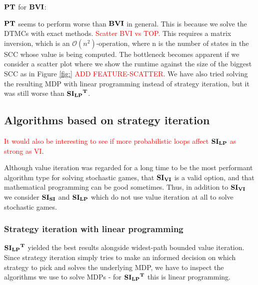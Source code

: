 $\mathbf{PT}$ for $\mathbf{BVI}$:

$\mathbf{PT}$ seems to perform worse than $\mathbf{BVI}$ in general. This is because we solve the DTMCs with exact methods. 
\textcolor{red}{Scatter BVI vs TOP.}
This requires a matrix inversion, which is an $\mathcal{O}(n^{2})$-operation, where n is the number of states in the SCC whose value is being computed.
The bottleneck becomes apparent if we consider a scatter plot where we show the runtime against the size of the biggest SCC as in Figure \ref{fig:} \textcolor{red}{ADD FEATURE-SCATTER}.
We have also tried solving the resulting MDP with linear programming instead of strategy iteration, but it was still worse than $\mathbf{\mathbf{SI_{LP}}^T}$.


\subsection{Algorithms based on strategy iteration}
\textcolor{red}{It would also be interesting to see if more probabilistic loops affect $\mathbf{SI_{LP}}$ as strong as VI}.

Although value iteration was regarded for a long time to be the most performant algorithm type for solving stochastic games, 
\cite{gandalf} that $\mathbf{SI_{VI}}$ is a valid option, and that mathematical programming can be good sometimes.
Thus, in addition to $\mathbf{SI_{VI}}$ we consider $\mathbf{SI_{SI}}$ and $\mathbf{SI_{LP}}$ which do not use value iteration at all to solve stochastic games.

\subsubsection*{Strategy iteration with linear programming}
$\mathbf{\mathbf{SI_{LP}}^T}$ yielded the best results alongside widest-path bounded value iteration.
Since strategy iteration simply tries to make an informed decision on which strategy to pick and solves the underlying MDP, 
we have to inspect the algorithms we use to solve MDPs - for $\mathbf{\mathbf{SI_{LP}}^T}$ this is linear programming.

